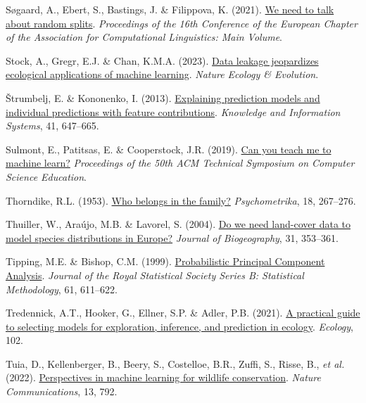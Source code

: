 \documentclass[
  letterpaper,
]{scrbook}
\newlength{\cslhangindent}
\newenvironment{CSLReferences}[2] %
 {\begin{list}{}{%
  \setlength{\itemindent}{0pt}
  \setlength{\leftmargin}{0pt}
  \setlength{\parsep}{0pt}
  \ifodd #1
   \setlength{\leftmargin}{\cslhangindent}
   \setlength{\itemindent}{-1\cslhangindent}
  \fi
  \setlength{\itemsep}{#2\baselineskip}}}
 {\end{list}}
\begin{document}
\begin{CSLReferences}{1}{0}
Søgaard, A., Ebert, S., Bastings, J. \& Filippova, K. (2021).
\href{https://doi.org/10.18653/v1/2021.eacl-main.156}{We need to talk
about random splits}. \emph{Proceedings of the 16th Conference of the
European Chapter of the Association for Computational Linguistics: Main
Volume}.

Stock, A., Gregr, E.J. \& Chan, K.M.A. (2023).
\href{https://doi.org/10.1038/s41559-023-02162-1}{Data leakage
jeopardizes ecological applications of machine learning}. \emph{Nature
Ecology \& Evolution}.

Štrumbelj, E. \& Kononenko, I. (2013).
\href{https://doi.org/10.1007/s10115-013-0679-x}{Explaining prediction
models and individual predictions with feature contributions}.
\emph{Knowledge and Information Systems}, 41, 647--665.

Sulmont, E., Patitsas, E. \& Cooperstock, J.R. (2019).
\href{https://doi.org/10.1145/3287324.3287392}{Can you teach me to
machine learn?} \emph{Proceedings of the 50th ACM Technical Symposium on
Computer Science Education}.

Thorndike, R.L. (1953). \href{https://doi.org/10.1007/bf02289263}{Who
belongs in the family?} \emph{Psychometrika}, 18, 267--276.

Thuiller, W., Araújo, M.B. \& Lavorel, S. (2004).
\href{https://doi.org/10.1046/j.0305-0270.2003.00991.x}{Do we need
land{-}cover data to model species distributions in Europe?}
\emph{Journal of Biogeography}, 31, 353--361.

Tipping, M.E. \& Bishop, C.M. (1999).
\href{https://doi.org/10.1111/1467-9868.00196}{Probabilistic Principal
Component Analysis}. \emph{Journal of the Royal Statistical Society
Series B: Statistical Methodology}, 61, 611--622.

Tredennick, A.T., Hooker, G., Ellner, S.P. \& Adler, P.B. (2021).
\href{https://doi.org/10.1002/ecy.3336}{A practical guide to selecting
models for exploration, inference, and prediction in ecology}.
\emph{Ecology}, 102.

Tuia, D., Kellenberger, B., Beery, S., Costelloe, B.R., Zuffi, S.,
Risse, B., \emph{et al.} (2022).
\href{https://doi.org/10.1038/s41467-022-27980-y}{Perspectives in
machine learning for wildlife conservation}. \emph{Nature
Communications}, 13, 792.


\end{CSLReferences}
\end{document}
